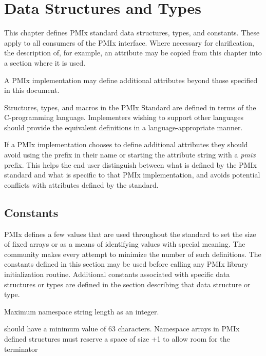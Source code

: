 \chapter{Data Structures and Types}
\label{chap:struct}

This chapter defines PMIx standard data structures, types, and constants.
These apply to all consumers of the PMIx interface.
Where necessary for clarification, the description of, for example, an attribute may be copied from this chapter into a section where it is used.

A PMIx implementation may define additional attributes beyond those specified in this document.

\adviceimplstart
Structures, types, and macros in the \ac{PMIx} Standard are defined in terms of the C-programming language. Implementers wishing to support other languages should provide the equivalent definitions in a language-appropriate manner.

If a PMIx implementation chooses to define additional attributes they should avoid using the  prefix in their name or starting the attribute string with a \textit{pmix} prefix.
This helps the end user distinguish between what is defined by the PMIx standard and what is specific to that PMIx implementation, and avoids potential conflicts with attributes defined by the standard.
\adviceimplend


\section{Constants}

\ac{PMIx} defines a few values that are used throughout the standard to set the size of fixed arrays or as a means of identifying values with special meaning.
The community makes every attempt to minimize the number of such definitions.
The constants defined in this section may be used before calling any \ac{PMIx} library initialization routine.
Additional constants associated with specific data structures or types are defined in the section describing that data structure or type.

\begin{constantdesc}
%
Maximum namespace string length as an integer.
\end{constantdesc}

\adviceimplstart
{} should have a minimum value of 63 characters. Namespace arrays in \ac{PMIx} defined structures must reserve
a space of size +1 to allow room for the  terminator
\adviceimplend


